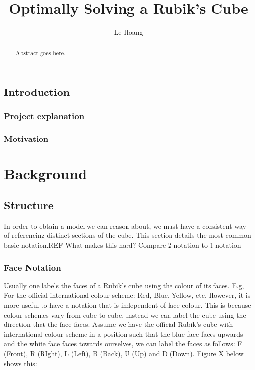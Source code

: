 \documentclass[titlepage]{report}[12pt]
\begin{document}
\title{Optimally Solving a Rubik's Cube}
\author{Le Hoang}
\maketitle
\begin{abstract}
Abstract goes here.
\end{abstract}

\section*{Introduction}

\subsection*{Project explanation}
\subsection*{Motivation}
\clearpage

\tableofcontents


\chapter{Background}


\section{Structure}
In order to obtain a model we can reason about, we must have a consistent way of referencing distinct sections of the cube. This section details the most common basic notation.REF
What makes this hard? Compare 2 notation to 1 notation

\subsection{Face Notation}
Usually one labels the faces of a Rubik's cube using the colour of its faces. E.g, For the official international colour scheme: Red, Blue, Yellow, etc. However, it is more useful to have a notation that is independent of face colour. This is because colour schemes vary from cube to cube. Instead we can label the cube using the direction that the face faces. Assume we have the official Rubik's cube with international colour scheme in a position such that the blue face faces upwards and the white face faces towards ourselves, we can label the faces as follows: F (Front), R (RIght), L (Left), B (Back), U (Up) and D (Down). Figure X below shows this:
\end{document}
